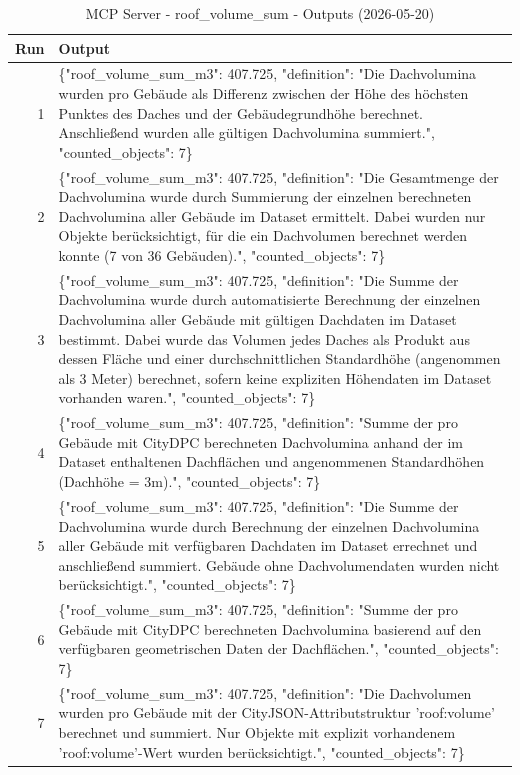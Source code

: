 \documentclass[a4paper,11pt]{article}
\begin{document}
\begin{table}[ht]
\centering
\scriptsize
\caption{MCP Server - roof\_volume\_sum - Outputs (2026-05-20)}
\label{tab:mcp\_roof\_volume\_sum\_outputs\_2026-05-20}
\begin{tabular}{r p{12cm}}
\hline
Run & Output \\
\hline
1 & \{"roof\_volume\_sum\_m3": 407.725, "definition": "Die Dachvolumina wurden pro Gebäude als Differenz zwischen der Höhe des höchsten Punktes des Daches und der Gebäudegrundhöhe berechnet. Anschließend wurden alle gültigen Dachvolumina summiert.", "counted\_objects": 7\} \\
2 & \{"roof\_volume\_sum\_m3": 407.725, "definition": "Die Gesamtmenge der Dachvolumina wurde durch Summierung der einzelnen berechneten Dachvolumina aller Gebäude im Dataset ermittelt. Dabei wurden nur Objekte berücksichtigt, für die ein Dachvolumen berechnet werden konnte (7 von 36 Gebäuden).", "counted\_objects": 7\} \\
3 & \{"roof\_volume\_sum\_m3": 407.725, "definition": "Die Summe der Dachvolumina wurde durch automatisierte Berechnung der einzelnen Dachvolumina aller Gebäude mit gültigen Dachdaten im Dataset bestimmt. Dabei wurde das Volumen jedes Daches als Produkt aus dessen Fläche und einer durchschnittlichen Standardhöhe (angenommen als 3 Meter) berechnet, sofern keine expliziten Höhendaten im Dataset vorhanden waren.", "counted\_objects": 7\} \\
4 & \{"roof\_volume\_sum\_m3": 407.725, "definition": "Summe der pro Gebäude mit CityDPC berechneten Dachvolumina anhand der im Dataset enthaltenen Dachflächen und angenommenen Standardhöhen (Dachhöhe = 3m).", "counted\_objects": 7\} \\
5 & \{"roof\_volume\_sum\_m3": 407.725, "definition": "Die Summe der Dachvolumina wurde durch Berechnung der einzelnen Dachvolumina aller Gebäude mit verfügbaren Dachdaten im Dataset errechnet und anschließend summiert. Gebäude ohne Dachvolumendaten wurden nicht berücksichtigt.", "counted\_objects": 7\} \\
6 & \{"roof\_volume\_sum\_m3": 407.725, "definition": "Summe der pro Gebäude mit CityDPC berechneten Dachvolumina basierend auf den verfügbaren geometrischen Daten der Dachflächen.", "counted\_objects": 7\} \\
7 & \{"roof\_volume\_sum\_m3": 407.725, "definition": "Die Dachvolumen wurden pro Gebäude mit der CityJSON-Attributstruktur 'roof:volume' berechnet und summiert. Nur Objekte mit explizit vorhandenem 'roof:volume'-Wert wurden berücksichtigt.", "counted\_objects": 7\} \\

\end{tabular}
\end{table}
\end{document}
